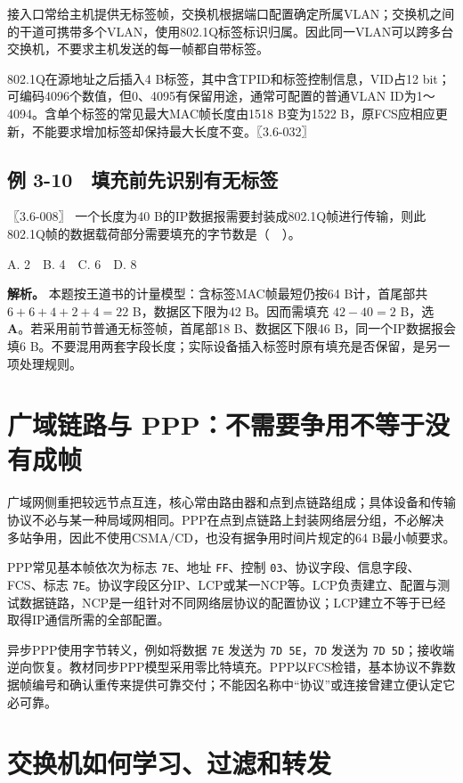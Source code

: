 接入口常给主机提供无标签帧，交换机根据端口配置确定所属VLAN；交换机之间的干道可携带多个VLAN，使用802.1Q标签标识归属。因此同一VLAN可以跨多台交换机，不要求主机发送的每一帧都自带标签。

802.1Q在源地址之后插入4 B标签，其中含TPID和标签控制信息，VID占12 bit；可编码4096个数值，但0、4095有保留用途，通常可配置的普通VLAN ID为1～4094。含单个标签的常见最大MAC帧长度由1518 B变为1522 B，原FCS应相应更新，不能要求增加标签却保持最大长度不变。〖3.6-032〗

\subsection{例 3-10　填充前先识别有无标签}\label{cn-ex3-10}

\noindent{}〖3.6-008〗 一个长度为40 B的IP数据报需要封装成802.1Q帧进行传输，则此802.1Q帧的数据载荷部分需要填充的字节数是（　）。

A. 2　B. 4　C. 6　D. 8


\textbf{解析。} 本题按王道书的计量模型：含标签MAC帧最短仍按64 B计，首尾部共 \(6+6+4+2+4=22\) B，数据区下限为42 B。因而需填充 \(42-40=2\) B，选 \textbf{A}。若采用前节普通无标签帧，首尾部18 B、数据区下限46 B，同一个IP数据报会填6 B。不要混用两套字段长度；实际设备插入标签时原有填充是否保留，是另一项处理规则。

\section{广域链路与 PPP：不需要争用不等于没有成帧}\label{cn-03-18}

广域网侧重把较远节点互连，核心常由路由器和点到点链路组成；具体设备和传输协议不必与某一种局域网相同。PPP在点到点链路上封装网络层分组，不必解决多站争用，因此不使用CSMA/CD，也没有据争用时间片规定的64 B最小帧要求。

PPP常见基本帧依次为标志 \texttt{7E}、地址 \texttt{FF}、控制 \texttt{03}、协议字段、信息字段、FCS、标志 \texttt{7E}。协议字段区分IP、LCP或某一NCP等。LCP负责建立、配置与测试数据链路，NCP是一组针对不同网络层协议的配置协议；LCP建立不等于已经取得IP通信所需的全部配置。

异步PPP使用字节转义，例如将数据 \texttt{7E} 发送为 \texttt{7D\ 5E}，\texttt{7D} 发送为 \texttt{7D\ 5D}；接收端逆向恢复。教材同步PPP模型采用零比特填充。PPP以FCS检错，基本协议不靠数据帧编号和确认重传来提供可靠交付；不能因名称中``协议''或连接曾建立便认定它必可靠。

\section{交换机如何学习、过滤和转发}\label{cn-03-19}


